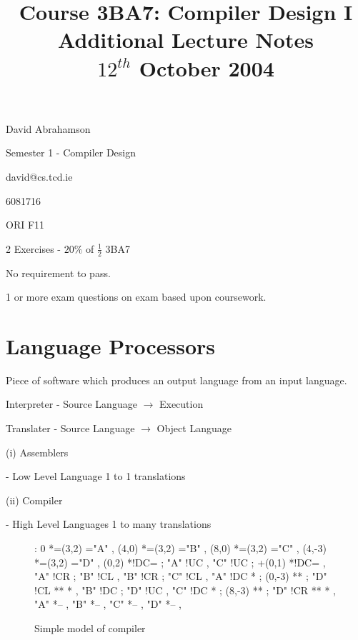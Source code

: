 \documentclass[a4paper,12pt]{article}
\begin{document}
\title{Course 3BA7: Compiler Design I \\ Additional Lecture Notes \\ $12^{th}$ October 2004}

\maketitle

David Abrahamson

Semester 1 - Compiler Design

david@cs.tcd.ie

6081716

ORI F11

2 Exercises - $20\%$ of $\frac{1}{2}$ 3BA7

No requirement to pass.

1 or more exam questions on exam based upon coursework.


\section{Language Processors}

Piece of software which produces an output language from an input
language.


Interpreter - Source Language $\to$ Execution

Translater -  Source Language $\to$ Object Language

(i) Assemblers
	
	- Low Level Language
	  1 to 1 translations

(ii) Compiler
	
	- High Level Languages
	  1 to many translations

\begin{figure}[ht]

\vspace{10mm}

\xy <1cm,0cm>:
0 *=(3,2)\frm{-}  ="A" ,
(4,0) *=(3,2)\frm{-} ="B" ,
(8,0) *=(3,2)\frm{-} ="C" ,
(4,-3) *=(3,2)\frm{-} ="D" ,
\POS (0,2) *!DC={} \ar ; "A" !UC ,
\POS "C" !UC \ar ; +(0,1) *!DC={} ,
\POS "A" !CR \ar ; "B" !CL , 
\POS "B" !CR \ar ; "C" !CL , 
\POS "A" !DC *\dir{<} ; (0,-3) **\dir{-} ; "D" !CL **\dir{-} *\dir{>} , 
\POS "B" !DC \ar@{<->} ; "D" !UC , 
\POS "C" !DC *\dir{<} ; (8,-3) **\dir{-} ; "D" !CR **\dir{-} *\dir{>} , 
\POS "A" *-- ,
\POS "B" *-- ,
\POS "C" *-- ,
\POS "D" *-- ,
\endxy

\caption{Simple model of compiler}

\end{figure}
\end{document}
